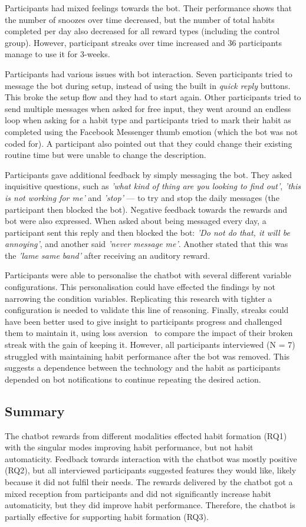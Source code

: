 Participants had mixed feelings towards the bot. Their performance shows that the number of snoozes over time decreased, but the number of total habits completed per day also decreased for all reward types (including the control group). However, participant streaks over time increased and 36 participants manage to use it for 3-weeks.

Participants had various issues with bot interaction. Seven participants tried to message the bot during setup, instead of using the built in \textit{quick reply} buttons. This broke the setup flow and they had to start again. Other participants tried to send multiple messages when asked for free input, they went around an endless loop when asking for a habit type and participants tried to mark their habit as completed using the Facebook Messenger thumb emotion (which the bot was not coded for). A participant also pointed out that they could change their existing routine time but were unable to change the description.

Participants gave additional feedback by simply messaging the bot. They asked inquisitive questions, such as \textit{'what kind of thing are you looking to find out'}, \textit{'this is not working for me'} and \textit{'stop'} --- to try and stop the daily messages (the participant then blocked the bot). Negative feedback towards the rewards and bot were also expressed. When asked about being messaged every day, a participant sent this reply and then blocked the bot: \textit{'Do not do that, it will be annoying'}, and another said \textit{'never message me'}. Another stated that this was the \textit{'lame same band'} after receiving an auditory reward.

Participants were able to personalise the chatbot with several different variable configurations. This personalisation could have effected the findings by not narrowing the condition variables. Replicating this research with tighter a configuration is needed to validate this line of reasoning. Finally, streaks could have been better used to give insight to participants progress and challenged them to maintain it, using loss aversion~\cite{loss_aversion} to compare the impact of their broken streak with the gain of keeping it. However, all participants interviewed (N = 7) struggled with maintaining habit performance after the bot was removed. This suggests a dependence between the technology and the habit as participants depended on bot notifications to continue repeating the desired action.


\subsection*{Summary}
The chatbot rewards from different modalities effected habit formation (RQ1) with the singular modes improving habit performance, but not habit automaticity. Feedback towards interaction with the chatbot was mostly positive (RQ2), but all interviewed participants suggested features they would like, likely because it did not fulfil their needs. The rewards delivered by the chatbot got a mixed reception from participants and did not significantly increase habit automaticity, but they did improve habit performance. Therefore, the chatbot is partially effective for supporting habit formation (RQ3).
